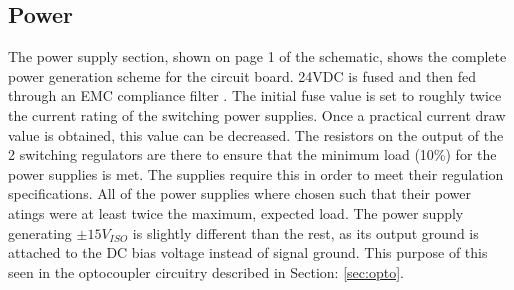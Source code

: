 \subsection {Power}
The power supply section, shown on page 1 of the schematic, shows the complete power generation scheme for the circuit board. 24VDC is fused and then fed through an EMC compliance filter \cite{5VswitchDatasheet}. The initial fuse value is set to roughly twice the current rating of the switching power supplies. Once a practical current draw value is obtained, this value can be decreased. The resistors on the output of the 2 switching regulators are there to ensure that the minimum load (10\%) for the power supplies is met. The supplies require this in order to meet their regulation specifications. All of the power supplies where chosen such that their power atings were at least twice the maximum, expected load. The power supply generating $\pm 15V_{ISO}$ is slightly different than the rest, as its output ground is attached to the DC bias voltage instead of signal ground. This purpose of this seen in the optocoupler circuitry described in Section: \ref{sec:opto}.

